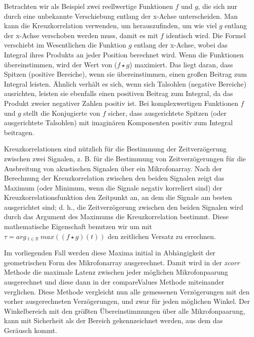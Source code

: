 Betrachten wir als Beispiel zwei reellwertige Funktionen $ f $ und $ g $, die sich nur durch eine unbekannte Verschiebung entlang der x-Achse unterscheiden. Man kann die Kreuzkorrelation verwenden, um herauszufinden, um wie viel $ g $ entlang der x-Achse verschoben werden muss, damit es mit $ f $ identisch wird. Die Formel verschiebt im Wesentlichen die Funktion $ g $ entlang der x-Achse, wobei das Integral ihres Produkts an jeder Position berechnet wird. Wenn die Funktionen übereinstimmen, wird der Wert von ($ f \star g $) maximiert. Das liegt daran, dass Spitzen (positive Bereiche), wenn sie übereinstimmen, einen großen Beitrag zum Integral leisten. Ähnlich verhält es sich, wenn sich Talsohlen (negative Bereiche) ausrichten, leisten sie ebenfalls einen positiven Beitrag zum Integral, da das Produkt zweier negativer Zahlen positiv ist. Bei komplexwertigen Funktionen $ f $ und $ g $ stellt die Konjugierte von $ f $ sicher, dass ausgerichtete Spitzen (oder ausgerichtete Talsohlen) mit imaginären Komponenten positiv zum Integral beitragen.

Kreuzkorrelationen sind nützlich für die Bestimmung der Zeitverzögerung zwischen zwei Signalen, z. B. für die Bestimmung von Zeitverzögerungen für die Ausbreitung von akustischen Signalen über ein Mikrofonarray. Nach der Berechnung der Kreuzkorrelation zwischen den beiden Signalen zeigt das Maximum (oder Minimum, wenn die Signale negativ korreliert sind) der Kreuzkorrelationsfunktion den Zeitpunkt an, an dem die Signale am besten ausgerichtet sind; d. h., die Zeitverzögerung zwischen den beiden Signalen wird durch das Argument des Maximums die Kreuzkorrelation bestimmt. Diese mathematische Eigenschaft benutzen wir um mit
$ \tau= arg\ _{t \in \mathbb{R}}\ max\left(( f \star g)(t)\right) $ den zeitlichen Versatz zu errechnen.

Im vorliegenden Fall werden diese Maxima initial in Abhängigkeit der geometrischen Form des Mikrofonarray ausgerechnet. Damit wird in der \textit{xcorr} Methode die maximale Latenz zwischen jeder möglichen Mikrofonpaarung ausgerechnet und diese dann in der compareValues Methode miteinander verglichen. Diese Methode vergleicht nun alle gemessenen Verzögerungen mit den vorher ausgerechneten Verzögerungen, und zwar für jeden möglichen Winkel. Der Winkelbereich mit den größten Übereinstimmungen über alle Mikrofonpaarung, kann mit Sicherheit als der Bereich gekennzeichnet werden, aus dem das Geräusch kommt.

\newpage